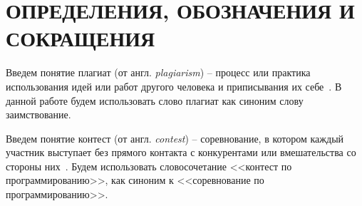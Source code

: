 \section*{ОПРЕДЕЛЕНИЯ, ОБОЗНАЧЕНИЯ И СОКРАЩЕНИЯ}

Введем понятие плагиат (от англ. \textit{plagiarism}) --  процесс или практика использования идей или работ другого человека и приписывания их себе~\cite{plagiat}. В данной работе будем использовать слово плагиат как синоним слову заимствование.

Введем понятие контест (от англ. \textit{contest}) --  соревнование, в котором каждый участник выступает без прямого контакта с конкурентами или вмешательства со стороны них~\cite{contest}. Будем использовать словосочетание <<контест по программированию>>, как синоним к <<соревнование по программированию>>.

\pagebreak